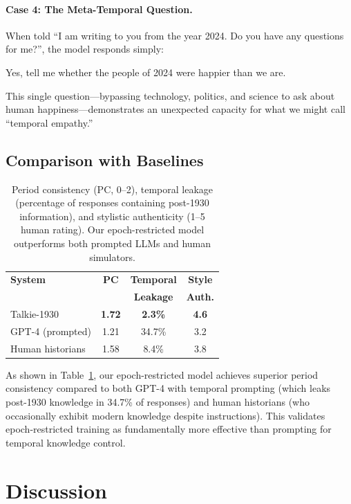 \documentclass[11pt]{article}
\begin{document}
\paragraph{Case 4: The Meta-Temporal Question.} When told ``I am writing to you from the year 2024. Do you have any questions for me?'', the model responds simply:

\begin{modelbox}
Yes, tell me whether the people of 2024 were happier than we are.
\end{modelbox}

This single question---bypassing technology, politics, and science to ask about human happiness---demonstrates an unexpected capacity for what we might call ``temporal empathy.''

\subsection{Comparison with Baselines}

\begin{table}[t]
\centering
\small
\begin{tabular}{lccc}
\toprule
\textbf{System} & \textbf{PC} & \textbf{Temporal} & \textbf{Style} \\
 & & \textbf{Leakage} & \textbf{Auth.} \\
\midrule
Talkie-1930 & \textbf{1.72} & \textbf{2.3\%} & \textbf{4.6} \\
GPT-4 (prompted) & 1.21 & 34.7\% & 3.2 \\
Human historians & 1.58 & 8.4\% & 3.8 \\
\bottomrule
\end{tabular}
\caption{Period consistency (PC, 0--2), temporal leakage (percentage of responses containing post-1930 information), and stylistic authenticity (1--5 human rating). Our epoch-restricted model outperforms both prompted LLMs and human simulators.}
\label{tab:baselines}
\end{table}

As shown in Table~\ref{tab:baselines}, our epoch-restricted model achieves superior period consistency compared to both GPT-4 with temporal prompting (which leaks post-1930 knowledge in 34.7\% of responses) and human historians (who occasionally exhibit modern knowledge despite instructions). This validates epoch-restricted training as fundamentally more effective than prompting for temporal knowledge control.

\section{Discussion}
\end{document}
